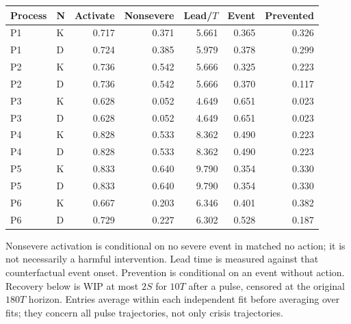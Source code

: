 \begin{center}\small\setlength{\tabcolsep}{4pt}\begin{tabular}{llrrrrr}\toprule

Process & N & Activate & Nonsevere & Lead/$T$ & Event & Prevented\\\midrule

P1 & K & 0.717 & 0.371 & 5.661 & 0.365 & 0.326\\

P1 & D & 0.724 & 0.385 & 5.979 & 0.378 & 0.299\\

P2 & K & 0.736 & 0.542 & 5.666 & 0.325 & 0.223\\

P2 & D & 0.736 & 0.542 & 5.666 & 0.370 & 0.117\\

P3 & K & 0.628 & 0.052 & 4.649 & 0.651 & 0.023\\

P3 & D & 0.628 & 0.052 & 4.649 & 0.651 & 0.023\\

P4 & K & 0.828 & 0.533 & 8.362 & 0.490 & 0.223\\

P4 & D & 0.828 & 0.533 & 8.362 & 0.490 & 0.223\\

P5 & K & 0.833 & 0.640 & 9.790 & 0.354 & 0.330\\

P5 & D & 0.833 & 0.640 & 9.790 & 0.354 & 0.330\\

P6 & K & 0.667 & 0.203 & 6.346 & 0.401 & 0.382\\

P6 & D & 0.729 & 0.227 & 6.302 & 0.528 & 0.187\\

\bottomrule\end{tabular}\end{center}

Nonsevere activation is conditional on no severe event in matched no action; it is not necessarily a harmful intervention. Lead time is measured against that counterfactual event onset. Prevention is conditional on an event without action. Recovery below is WIP at most $2S$ for $10T$ after a pulse, censored at the original $180T$ horizon. Entries average within each independent fit before averaging over fits; they concern all pulse trajectories, not only crisis trajectories.

